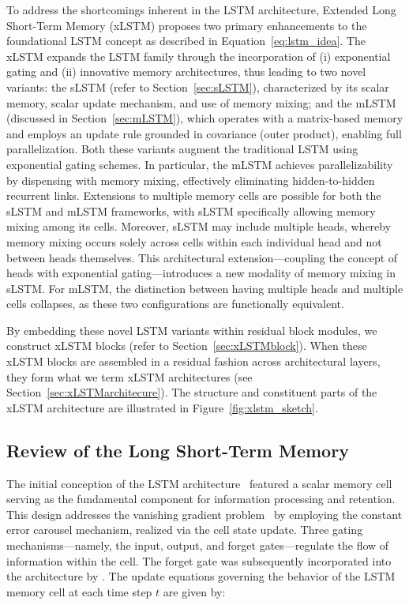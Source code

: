 To address the shortcomings inherent in the LSTM architecture, Extended Long Short-Term Memory (xLSTM) proposes two primary enhancements to the foundational LSTM concept as described in Equation~\eqref{eq:lstm_idea}. The xLSTM expands the LSTM family through the incorporation of (i) exponential gating and (ii) innovative memory architectures, thus leading to two novel variants: the sLSTM (refer to Section~\ref{sec:sLSTM}), characterized by its scalar memory, scalar update mechanism, and use of memory mixing; and the mLSTM (discussed in Section~\ref{sec:mLSTM}), which operates with a matrix-based memory and employs an update rule grounded in covariance (outer product), enabling full parallelization. Both these variants augment the traditional LSTM using exponential gating schemes. In particular, the mLSTM achieves parallelizability by dispensing with memory mixing, effectively eliminating hidden-to-hidden recurrent links. Extensions to multiple memory cells are possible for both the sLSTM and mLSTM frameworks, with sLSTM specifically allowing memory mixing among its cells. Moreover, sLSTM may include multiple heads, whereby memory mixing occurs solely across cells within each individual head and not between heads themselves. This architectural extension—coupling the concept of heads with exponential gating—introduces a new modality of memory mixing in sLSTM. For mLSTM, the distinction between having multiple heads and multiple cells collapses, as these two configurations are functionally equivalent.

By embedding these novel LSTM variants within residual block modules, we construct xLSTM blocks (refer to Section~\ref{sec:xLSTMblock}). When these xLSTM blocks are assembled in a residual fashion across architectural layers, they form what we term xLSTM architectures (see Section~\ref{sec:xLSTMarchitecure}). The structure and constituent parts of the xLSTM architecture are illustrated in Figure~\ref{fig:xlstm_sketch}.

\subsection{Review of the Long Short-Term Memory}
\label{sec:orgLSTM}

The initial conception of the LSTM architecture~\citep{Hochreiter:91,Hochreiter:97nips,Hochreiter:97} featured a scalar memory cell serving as the fundamental component for information processing and retention. This design addresses the vanishing gradient problem~\citep{Hochreiter:91,Hochreiter:00book} by employing the constant error carousel mechanism, realized via the cell state update. Three gating mechanisms—namely, the input, output, and forget gates—regulate the flow of information within the cell. The forget gate was subsequently incorporated into the architecture by \citet{Gers:00}. The update equations governing the behavior of the LSTM memory cell at each time step $t$ are given by:

